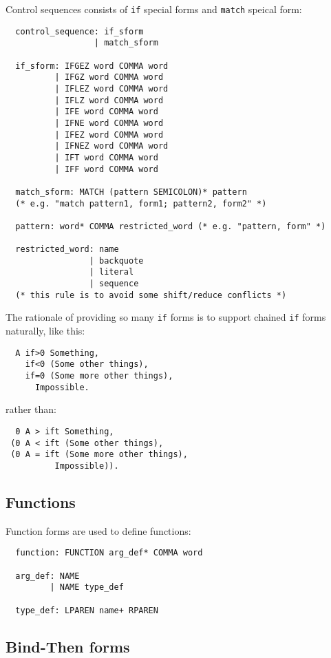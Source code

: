 \documentclass{book}
\begin{document}
Control sequences consists of \texttt{if} special forms and \texttt{match} speical form:
\begin{verbatim}
  control_sequence: if_sform
                  | match_sform

  if_sform: IFGEZ word COMMA word
          | IFGZ word COMMA word
          | IFLEZ word COMMA word
          | IFLZ word COMMA word
          | IFE word COMMA word
          | IFNE word COMMA word
          | IFEZ word COMMA word
          | IFNEZ word COMMA word
          | IFT word COMMA word
          | IFF word COMMA word

  match_sform: MATCH (pattern SEMICOLON)* pattern
  (* e.g. "match pattern1, form1; pattern2, form2" *)

  pattern: word* COMMA restricted_word (* e.g. "pattern, form" *)

  restricted_word: name
                 | backquote
                 | literal
                 | sequence
  (* this rule is to avoid some shift/reduce conflicts *)
\end{verbatim}

The rationale of providing so many \texttt{if} forms is to support chained \texttt{if} forms naturally, like this:
\begin{verbatim}
  A if>0 Something,
    if<0 (Some other things),
    if=0 (Some more other things),
      Impossible.
\end{verbatim}

rather than:
\begin{verbatim}
  0 A > ift Something,
 (0 A < ift (Some other things),
 (0 A = ift (Some more other things),
          Impossible)).
\end{verbatim}

\subsection{Functions}

Function forms are used to define functions:
\begin{verbatim}
  function: FUNCTION arg_def* COMMA word

  arg_def: NAME
         | NAME type_def

  type_def: LPAREN name+ RPAREN
\end{verbatim}

\subsection{Bind-Then forms}
\end{document}
